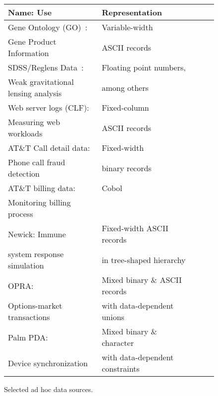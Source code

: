 \begin{figure}
\begin{center}
\scriptsize
\begin{tabular}{@{}|l|l|l|l|l|}
\hline
Name: Use                               & Representation     \\ \hline\hline
Gene Ontology (GO)~\cite{geneontology}: & Variable-width     \\
Gene Product Information 	           & ASCII records      \\ \hline
SDSS/Reglens Data~\cite{mandelbaum+:reglens}:  & Floating point numbers,  \\
Weak gravitational lensing analysis     & among others       \\ \hline
Web server logs (CLF):                  & Fixed-column       \\ 
Measuring web workloads                 & ASCII records      \\ \hline
AT\&T Call detail data:                 & Fixed-width        \\
Phone call fraud detection              & binary records     \\ \hline 
AT\&T billing data:                     & Cobol              \\ 
Monitoring billing process              &                    \\ \hline
Newick:   Immune                        & Fixed-width ASCII records  \\ 
system response simulation              & in tree-shaped hierarchy   \\ \hline                                
OPRA:                                   & Mixed binary \& ASCII records  \\
Options-market transactions             & with data-dependent unions     \\ \hline
Palm PDA:                               & Mixed binary \& character  \\
Device synchronization                  & with data-dependent constraints \\ \hline
\end{tabular}
\caption{Selected ad hoc data sources.}
\label{figure:data-sources}
\end{center}
\end{figure}

